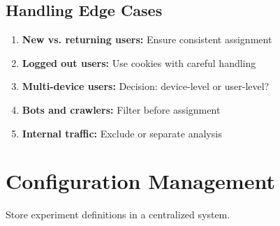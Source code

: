 \subsection{Handling Edge Cases}

\begin{enumerate}
    \item \textbf{New vs. returning users:} Ensure consistent assignment

    \item \textbf{Logged out users:} Use cookies with careful handling

    \item \textbf{Multi-device users:} Decision: device-level or user-level?

    \item \textbf{Bots and crawlers:} Filter before assignment

    \item \textbf{Internal traffic:} Exclude or separate analysis
\end{enumerate}

\section{Configuration Management}

Store experiment definitions in a centralized system.

